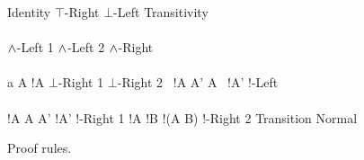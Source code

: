 \begin{FIGURE}
\begin{RULES}

  \ZEROPREMISERULENAMEDRIGHT
  {
    \phi \judge \phi
  }{Identity}
    \quad
  \ZEROPREMISERULENAMEDRIGHT
  {
    \phi \judge \top
  }{$\top$-Right}
    \quad
  \ZEROPREMISERULENAMEDRIGHT
  {
    \bot \judge \phi
  }{$\bot$-Left}
    \quad
  \TWOPREMISERULENAMEDRIGHT
  {
    \phi \judge \psi
  }
  {
    \psi \judge \xi
  }
  {
    \phi \judge \xi
  }{Transitivity}
    \\\\
  \ONEPREMISERULENAMEDRIGHT
  {
    \phi \judge \psi
  }
  {
    \phi \AND \xi \judge \psi
  }{$\land$-Left 1}
     \quad
  \ONEPREMISERULENAMEDRIGHT
  {
    \phi \judge \psi
  }
  {
    \xi \AND \phi  \judge \psi
  }{$\land$-Left 2}
     \quad
  \TWOPREMISERULENAMEDRIGHT
  {
    \phi \judge \psi
  }
  {
    \phi \judge \xi
  }
  {
    \phi \judge \psi \AND \xi
  }{$\land$-Right}
     \\\\
     \ONEPREMISERULENAMEDRIGHT
     {
       a \notin A
     }
     {
       !A \AND {} \judge \bot
     }{$\bot$-Right 1}
        \quad
     \ZEROPREMISERULENAMEDRIGHT
     {
        \judge \bot
     }{$\bot$-Right 2}
        \quad
     \TWOPREMISERULENAMEDRIGHT
     {
       \phi \AND \, !A \judge \psi
     }
     {
       A' \subseteq A
     }
     {
       \phi \AND\, !A' \judge \psi
     }{!-Left}
     \\\\
     \TWOPREMISERULENAMEDRIGHT
     {
       \phi \judge !A
     }
     {
       A \subseteq A'
     }
     {
       \phi \judge!A'
     }{!-Right 1}
     \quad
     \TWOPREMISERULENAMEDRIGHT
     {
       \phi \judge !A
     }
     {
       \phi \judge !B
     }
     {
       \phi \judge !(A \cap B)
     }{!-Right 2}
     \quad
     \ONEPREMISERULENAMEDRIGHT
     {
       \phi \judge \psi
     }
     {
        \judge {}
     }{Transition Normal}
\end{RULES}
\caption{Proof rules.}\label{figure:elAndBangRules}
\end{FIGURE}
